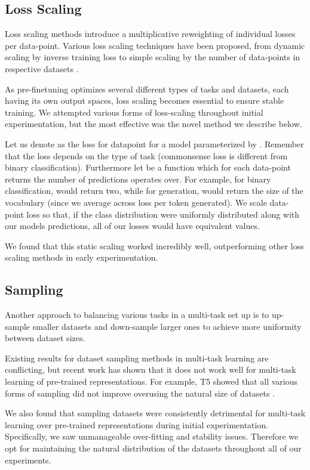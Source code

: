 \documentclass[11pt,a4paper]{article}
\begin{document}
\subsection{Loss Scaling}
\label{sec:loss_scaling}
Loss scaling methods introduce a multiplicative reweighting of individual losses per data-point. Various loss scaling techniques have been proposed, from dynamic scaling by inverse training loss to simple scaling by the number of data-points in respective datasets \citep{gradnorm_mtl}.

As pre-finetuning optimizes several different types of tasks and datasets, each having its own output spaces, loss scaling becomes essential to ensure stable training.
We attempted various forms of loss-scaling throughout initial experimentation, but the most effective was the novel method we describe below. 

Let us denote  as the loss for datapoint  for a model parameterized by . Remember that the loss depends on the type of task (commonsense loss is different from binary classification). Furthermore let  be a function which for each data-point returns the number of predictions  operates over. For example, for binary classification,  would return two, while for generation,  would return the size of the vocabulary (since we average across loss per token generated). We scale data-point loss so that, if the class distribution were uniformly distributed along with our models predictions, all of our losses would have equivalent values.


We found that this static scaling worked incredibly well, outperforming other loss scaling methods in early experimentation.

\subsection{Sampling}
Another approach to balancing various tasks in a multi-task set up is to up-sample smaller datasets and down-sample larger ones to achieve more uniformity between dataset sizes.

Existing results for dataset sampling methods in multi-task learning are conflicting, but recent work has shown that it does not work well for multi-task learning of pre-trained representations. For example, T5 showed that all various forms of sampling did not improve overusing the natural size of datasets \citep{T5}.

We also found that sampling datasets were consistently detrimental for multi-task learning over pre-trained representations during initial experimentation. Specifically, we saw unmanageable over-fitting and stability issues. Therefore we opt for maintaining the natural distribution of the datasets throughout all of our experiments.
\end{document}
